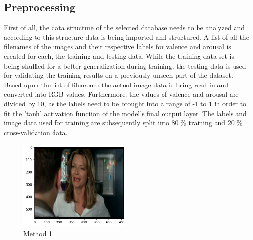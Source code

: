 \subsection{Preprocessing}
First of all, the data structure of the selected database needs to be analyzed and according to this structure data is being imported and structured. A list of all the filenames of the images and their respective labels for valence and arousal is created for each, the training and testing data. While the training data set is being shuffled for a better generalization during training, the testing data is used for validating the training results on a previously unseen part of the dataset.
\newline\newline
Based upon the list of filenames the actual image data is being read in and converted into RGB values. Furthermore, the values of valence and arousal are divided by 10, as the labels need to be brought into a range of -1 to 1 in order to fit the 'tanh' activation function of the model's final output layer.
\newline\newline
The labels and image data used for training are subsequently split into 80 \% training and 20 \% cross-validation data. 

\begin{center}
\begin{figure}[H]
  \begin{center}
  \includegraphics[angle=0, width=0.5\textwidth]{Figures/method_1.png}
  \caption{Method 1}
  \label{fig:MachineLearningModelMethod_1}
  \end{center}
\end{figure}
\end{center}


